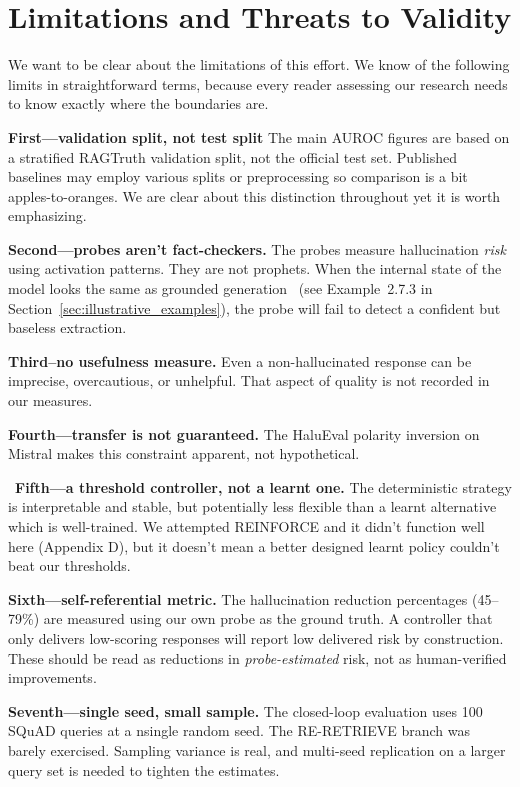 \section{Limitations and Threats to Validity}
\label{sec:limitations}

We want to be clear about the limitations of this effort. We know of the following limits in straightforward terms, because every reader assessing our research needs to know exactly where the boundaries are.

\textbf{First—validation split, not test split} The main AUROC figures are based on a stratified RAGTruth validation split, not the official test set. Published baselines may employ various splits or preprocessing so comparison is a bit apples-to-oranges. We are clear about this distinction throughout yet it is worth emphasizing.

\textbf{Second—probes aren't fact-checkers.} The probes measure hallucination \emph{risk} using activation patterns. They are not prophets. When the internal state of the model looks the same as grounded generation  (see Example~2.7.3 in Section~\ref{sec:illustrative_examples}), the probe will fail to detect a confident but baseless extraction.

\textbf{Third--no usefulness measure.} Even a non-hallucinated response can be imprecise, overcautious, or unhelpful. That aspect of quality is not recorded in our measures.

\textbf{Fourth—transfer is not guaranteed.} The HaluEval polarity inversion on Mistral makes this constraint apparent, not hypothetical. 

 \textbf{Fifth—a threshold controller, not a learnt one.} The deterministic strategy is interpretable and stable, but potentially less flexible than a learnt alternative which is well-trained. We attempted REINFORCE and it didn't function well here (Appendix D), but it doesn't mean a better designed learnt policy couldn't beat our thresholds.

\textbf{Sixth—self-referential metric.} The hallucination reduction percentages (45--79\%) are measured using our own probe as the ground truth. A controller that only delivers low-scoring responses will report low delivered risk by construction. These should be read as reductions in \emph{probe-estimated} risk, not as human-verified improvements.

\textbf{Seventh—single seed, small sample.} The closed-loop evaluation uses 100 SQuAD queries at a nsingle random seed. The RE-RETRIEVE branch was barely exercised. Sampling variance is real, and multi-seed replication on a larger query set is needed to tighten the estimates.

